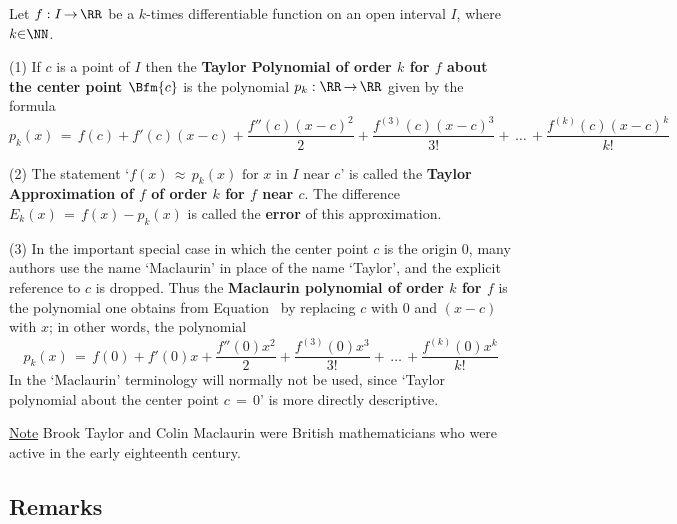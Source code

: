 {        Let $f:I \,{\rightarrow}\, {\RR}$ be a $k$-times differentiable function on an open interval $I$, where $k{\in}{\NN}$.

\V

        (1) If $c$ is a point of $I$ then the {\bf Taylor Polynomial of order $k$ for $f$ about the center point $\Bfm{c}$}
    is the polynomial $p_{k}:{\RR} \,{\rightarrow}\, {\RR}$ given by the formula
        \begin{equation}
        \label{EqnE.120A}
        p_{k}(x) \,=\, f(c) + f'(c)(x-c) + \frac{f''(c)(x-c)^{2}}{2} + \frac{f^{(3)}(c)(x-c)^{3}}{3!} + \,{\ldots}\,+ \frac{f^{(k)}(c)(x-c)^{k}}{k!}
        \end{equation}

\V

        (2) The statement `$f(x) \,{\approx}\, p_{k}(x) \mbox{ for $x$ in $I$ near $c$}$'
    is called the {\bf Taylor Approximation of $f$ of order $k$ for $f$ near $c$}.
    The difference $E_{k}(x) \,=\, f(x) - p_{k}(x)$ is called the {\bf error} of this approximation.

\V

        (3) In the important special case in which the center point $c$ is the origin $0$, many authors use the name `Maclaurin' in place of the name `Taylor',
    and the explicit reference to $c$ is dropped. Thus the {\bf Maclaurin polynomial of order $k$ for $f$}
    is the polynomial one obtains from Equation~ by replacing $c$ with $0$ and $(x-c)$ with $x$; in other words, the polynomial
        \begin{equation}
        \label{EqnE.120B}
        p_{k}(x) \,=\, f(0) + f'(0)x + \frac{f''(0)x^{2}}{2} + \frac{f^{(3)}(0)x^{3}}{3!} + \,{\ldots}\,+ \frac{f^{(k)}(0)x^{k}}{k!}
        \end{equation}
    In {\ThisText} the `Maclaurin' terminology will normally not be used, since `Taylor polynomial about the center point $c \,=\, 0$'
    is more directly descriptive.

        \underline{Note} Brook Taylor and Colin Maclaurin were British mathematicians who were active in the early eighteenth century.

\VV

            \subsection{\small{\bf Remarks}}
            \label{RemrkE60.25}

}
